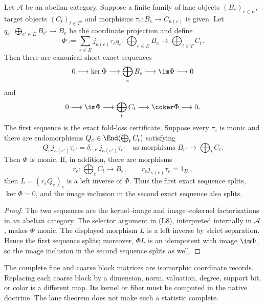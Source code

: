 \begin{theorem}
\label{thm:block15-abelian-fold-exact-sequence}
Let \(\mathcal A\) be an abelian category.  Suppose a finite family of lane
objects \((B_e)_{e\in E}\), target objects \((C_t)_{t\in T}\), and morphisms
\(\tau_e:B_e\to C_{\kappa(e)}\) is given.  Let
\(q_e:\bigoplus_{e'\in E}B_{e'}\to B_e\) be the coordinate projection and
define
\[
 \Phi:=\sum_{e\in E}j_{\kappa(e)}\tau_eq_e:
 \bigoplus_{e\in E}B_e\longrightarrow
 \bigoplus_{t\in T}C_t.
\]
Then there are canonical short exact sequences
\[
 0\longrightarrow\ker\Phi
 \longrightarrow\bigoplus_eB_e
 \longrightarrow\im\Phi
 \longrightarrow0
\]
and
\[
 0\longrightarrow\im\Phi
 \longrightarrow\bigoplus_tC_t
 \longrightarrow\coker\Phi
 \longrightarrow0.
\]
The first sequence is the exact fold-loss certificate.  Suppose every
\(\tau_e\) is monic and there are endomorphisms
\(Q_e\in\End(\bigoplus_tC_t)\) satisfying
\[
 Q_ej_{\kappa(e')}\tau_{e'}
 =\delta_{e,e'}j_{\kappa(e')}\tau_{e'}
 \quad\text{as morphisms }B_{e'}\longrightarrow\bigoplus_tC_t.
\]
Then \(\Phi\) is monic.  If, in addition, there are morphisms
\[
 r_e:\bigoplus_tC_t\longrightarrow B_e,
 \qquad r_ej_{\kappa(e)}\tau_e=1_{B_e},
\]
then \(L=(r_eQ_e)_e\) is a left inverse of \(\Phi\).  Thus the first exact
sequence splits, \(\ker\Phi=0\), and the image inclusion in the second exact
sequence also splits.
\end{theorem}

\begin{proof}
The two sequences are the kernel--image and image--cokernel factorizations in
an abelian category.  The selector argument in (L8), interpreted internally
in \(\mathcal A\), makes \(\Phi\) monic.  The displayed morphism \(L\) is a
left inverse by strict separation.  Hence the first sequence splits;
moreover, \(\Phi L\) is an idempotent with image \(\im\Phi\), so the image
inclusion in the second sequence splits as well.
\end{proof}

\begin{boundary}
\label{bnd:block15-coordinate-vs-statistic-coarsening}
The complete fine and coarse block matrices are isomorphic coordinate records.
Replacing each coarse block by a dimension, norm, valuation, degree, support
bit, or color is a different map.  Its kernel or fiber must be computed in the
native doctrine.  The lane theorem does not make such a statistic complete.
\end{boundary}

